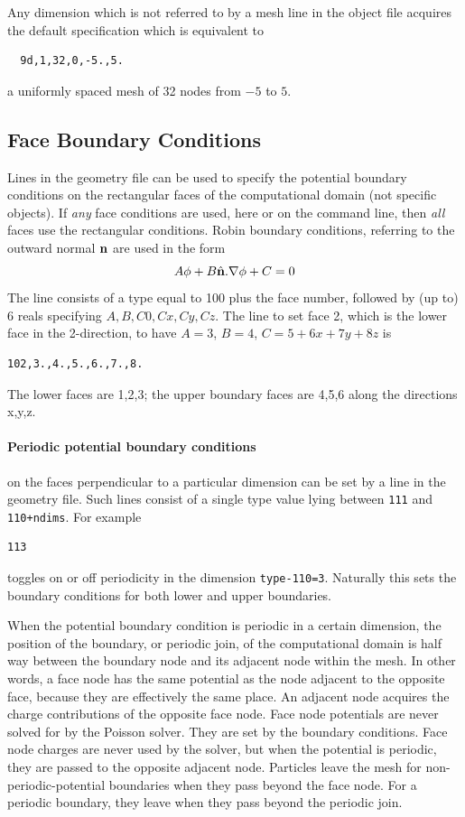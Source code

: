 \documentclass[12pt]{article}
\begin{document}
Any dimension which is not referred to by a mesh line in the object
file acquires the default specification which is equivalent to
\begin{verbatim}
  9d,1,32,0,-5.,5.
\end{verbatim}
a uniformly spaced mesh of 32 nodes from $-5$ to $5$.

\subsection{Face Boundary Conditions}

Lines in the geometry file can be used to specify the potential
boundary conditions on the rectangular faces of the computational
domain (not specific objects). If \emph{any} face conditions are used,
here or on the command line, then \emph{all} faces use the rectangular
conditions.  Robin boundary conditions, referring to the outward
normal ${\bf n}$ are used in the form
$$A\phi + B \hat{\bf n}.\nabla\phi + C =0$$
The line consists of a type equal to 100 plus the face number,
followed by (up to) 6 reals specifying $A,B,C0,Cx,Cy,Cz$.
The line to set face 2, which is the lower face in the 2-direction, to
have $A=3$, $B=4$, $C=5+6x+7y+8z$ is
\begin{verbatim}
102,3.,4.,5.,6.,7.,8.
\end{verbatim}
The lower faces are 1,2,3; the upper boundary faces are 4,5,6 along
the directions x,y,z.

\paragraph{Periodic potential boundary conditions}
on the faces perpendicular to a particular dimension can be set by a
line in the geometry file. Such lines consist of a single type value lying
between \verb!111! and \verb!110+ndims!. For example
\begin{verbatim}
113
\end{verbatim}
toggles on or off periodicity in the dimension
\verb!type-110=3!. Naturally this sets the boundary conditions for
both lower and upper boundaries. 

When the potential boundary condition is periodic in a certain
dimension, the position of the boundary, or periodic join, of the
computational domain is half way between the boundary node and its
adjacent node within the mesh. In other words, a face node has the
same potential as the node adjacent to the opposite face, because they
are effectively the same place. An adjacent node acquires the charge
contributions of the opposite face node. Face node potentials are
never solved for by the Poisson solver. They are set by the boundary
conditions. Face node charges are never used by the solver, but when
the potential is periodic, they are passed to the opposite adjacent
node. Particles leave the mesh for non-periodic-potential boundaries
when they pass beyond the face node. For a periodic boundary, they
leave when they pass beyond the periodic join.
\end{document}
